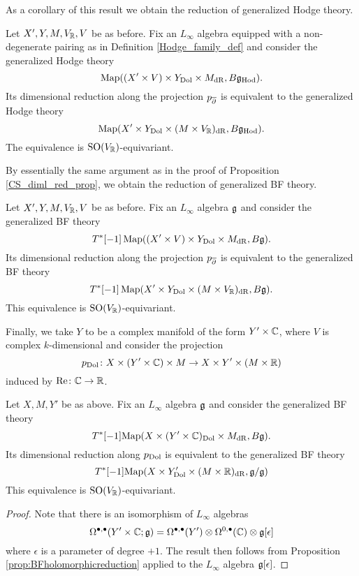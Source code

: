 \documentclass[10pt, oneside]{article}
\newcommand{\Hod}{\mathrm{Hod}}
\begin{document}
As a corollary of this result we obtain the reduction of generalized Hodge theory.

\begin{corollary}
Let $X', Y, M, V_\mathbb R, V$ be as before. 
Fix an $L_\infty$ algebra equipped with a non-degenerate pairing as in Definition \ref{Hodge_family_def} and consider the generalized Hodge theory
\[\map((X'\times V)\times Y_{\mr{Dol}}\times M_{\mr{dR}}, B\fg_\Hod).\]
Its dimensional reduction along the projection $p_{\overline{\partial}}$ is equivalent to the generalized Hodge theory
\[\map(X'\times Y_{\mr{Dol}}\times (M\times V_\RR)_{\mr{dR}}, B\fg_\Hod).\]
The equivalence is $\mathrm{SO}(V_\mathbb R)$-equivariant.
\label{cor:Hodgeholomorphicreduction}
\end{corollary}

By essentially the same argument as in the proof of Proposition \ref{CS_diml_red_prop}, we obtain the reduction of generalized BF theory. 

\begin{prop}
Let $X', Y, M, V_\mathbb R, V$ be as before. 
Fix an $L_\infty$ algebra $\mathfrak g$ and consider the generalized BF theory
\[T^*[-1] \operatorname{Map}((X'\times V)\times Y_{\mathrm{Dol}}\times M_{\mathrm{dR}}, B\mathfrak g).\]
Its dimensional reduction along the projection $p_{\overline{\partial}}$ is equivalent to the generalized BF theory
\[T^*[-1] \operatorname{Map}(X'\times Y_{\mathrm{Dol}}\times (M\times V_\mathbb R)_{\mathrm{dR}}, B\mathfrak g).\]
This equivalence is $\mathrm{SO}(V_\mathbb R)$-equivariant.
\label{prop:BFholomorphicreduction}
\end{prop}

Finally, we take $Y$ to be a complex manifold of the form $Y' \times \mathbb C$, where $V$ is complex $k$-dimensional and consider the projection
\[
p_{\rm Dol} \colon X \times (Y' \times \mathbb C) \times M \to X \times Y' \times (M \times \mathbb R) 
\]
induced by ${\rm Re} \colon \mathbb C \to \mathbb R$.

\begin{prop}
\label{prop:BFdolbeaultreduction}
Let $X, M, Y'$ be as above.
Fix an $L_\infty$ algebra $\mathfrak g$ and consider the generalized BF theory
\[
T^*[-1] {\rm Map}(X \times (Y' \times \mathbb C)_{\rm Dol} \times M_{\rm dR} , B \mathfrak g) .
\]
Its dimensional reduction along $p_{\rm Dol}$ is equivalent to the generalized BF theory
\[
T^*[-1] {\rm Map} (X \times Y'_{\rm Dol} \times (M \times \mathbb R)_{\rm dR}, \mathfrak g / \mathfrak g)
\]
This equivalence is $\mathrm{SO}(V_\mathbb R)$-equivariant.
\end{prop}
\begin{proof}
Note that there is an isomorphism of $L_\infty$ algebras
\[
\Omega^{\bullet, \bullet} (Y' \times \mathbb C ; \mathfrak g) = \Omega^{\bullet,\bullet}(Y') \otimes \Omega^{0,\bullet}(\mathbb C) \otimes \mathfrak g[\epsilon]
\]
where $\epsilon$ is a parameter of degree $+1$.
The result then follows from Proposition \ref{prop:BFholomorphicreduction} applied to the $L_\infty$ algebra $\mathfrak g[\epsilon]$. 
\end{proof}
\end{document}
